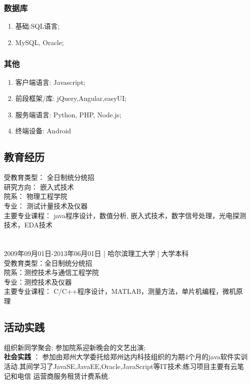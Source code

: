 \documentclass[11pt]{ctexart}
\begin{document}
\subsubsection{数据库}
\label{sec-1-2-3}
\begin{enumerate}
\item 基础:SQL语言;
\item MySQL, Oracle;
\end{enumerate}
\subsubsection{其他}
\label{sec-1-2-4}
\begin{enumerate}
\item 客户端语言: Javascript;
\item 前段框架/库: jQuery,Angular,easyUI;
\item 服务端语言: Python, PHP, Node.js;
\item 终端设备: Android
\end{enumerate}
\subsection{教育经历}
\label{sec-1-3}
受教育类型： 全日制统分统招\\
研究方向： 嵌入式技术\\
院系： 物理工程学院\\
专业： 测试计量技术及仪器\\
主要专业课程： java程序设计，数值分析, 嵌入式技术，数字信号处理，光电探测技术，EDA技术\\
\\
\\
2009年09月01日-2013年06月01日 | 哈尔滨理工大学 | 大学本科\\
受教育类型：全日制统分统招\\
院系：测控技术与通信工程学院\\
专业：测控技术及仪器\\
主要专业课程： C/C++程序设计，MATLAB，测量方法，单片机编程，微机原理\\
\subsection{活动实践}
\label{sec-1-4}
组织新同学聚会;
参加院系迎新晚会的文艺出演;\\
\textbf{社会实践} ： 参加由郑州大学委托给郑州达内科技组织的为期4个月的java软件实训活动.其间学习了JavaSE,JavaEE,Oracle,JavaScript等IT技术;练习项目主要有云笔记和电信
运营商服务租赁计费系统.
\end{document}
